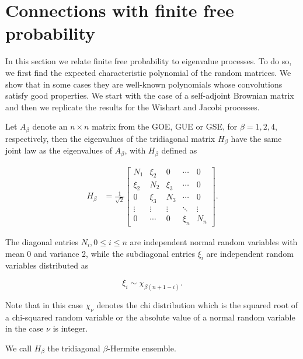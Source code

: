 \section{Connections with finite free probability}

In this section we relate finite free probability to eigenvalue processes. To do so, we first find the expected characteristic polynomial of the random matrices. We show that in some cases they are well-known polynomials whose convolutions satisfy good properties. We start with the case of a self-adjoint Brownian matrix and then we replicate the results for the Wishart and Jacobi processes.

\begin{lemma} \label{lemma:tridiag}
    Let $A_{\beta}$ denote an $n\times n$ matrix from the GOE, GUE or GSE, for $\beta = 1,2,4$, respectively, then the eigenvalues of the tridiagonal matrix $H_\beta$ have the same joint law as the eigenvalues of $A_\beta$, with $H_\beta$ defined as

    \begin{align} \label{eq:tridiag_hermite}
        H_\beta &= \frac1{\sqrt2}\begin{bmatrix}
            N_1   & \xi_2 & 0     & \cdots & 0 \\ 
            \xi_2 & N_2   & \xi_3 & \cdots & 0 \\
            0     & \xi_3 & N_3  & \cdots & 0 \\
            \vdots & \vdots & \vdots & \ddots & \vdots \\ 
            0      & \cdots & 0      & \xi_{n} & N_n 
        \end{bmatrix}.
    \end{align}

    The diagonal entries $N_i, 0 \le i \le n$ are independent normal random variables with mean 0 and variance 2, while the subdiagonal entries $\xi_i$ are independent random variables distributed as

    \[ \xi_i \sim \chi_{\beta(n+1-i)}. \]

    Note that in this case $\chi_\nu$ denotes the chi distribution which is the squared root of a chi-squared random variable or the absolute value of a normal random variable in the case $\nu$ is integer.

    We call $H_\beta$ the tridiagonal $\beta$-Hermite ensemble.

\end{lemma}

